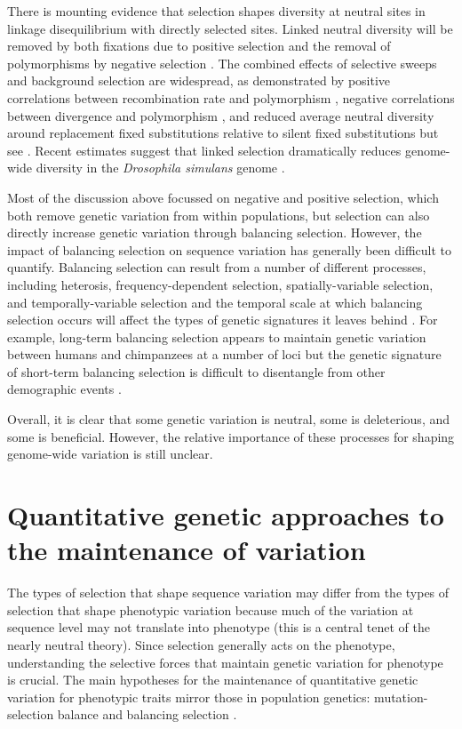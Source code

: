 There is mounting evidence that selection shapes diversity at neutral sites in linkage disequilibrium with directly selected sites. Linked neutral diversity will be removed by both fixations due to positive selection \citep{Smith1974} and the removal of polymorphisms by negative selection \citep{Charlesworth1993-xx}. The combined effects of selective sweeps and background selection are widespread, as demonstrated by positive correlations between recombination rate and polymorphism \citep{Cutter2003-yq,Nachman1998-vc,Kim2007-ju,Begun2007-gh,Tenaillon2001-ai}, negative correlations between divergence and polymorphism \citep{Andolfatto2007-ew,Hahn2008-yj,Macpherson2007-pl}, and reduced average neutral diversity around replacement fixed substitutions relative to silent fixed substitutions \citep{Sattath2011-ns} but see \citep{hernandez2011}. Recent estimates suggest that linked selection dramatically reduces genome-wide diversity in the \textit{Drosophila simulans} genome \citep{Elyashiv2014-ic}.

Most of the discussion above focussed on negative and positive selection, which both remove genetic variation from within populations, but selection can also directly increase genetic variation through balancing selection. However, the impact of balancing selection on sequence variation has generally been difficult to quantify. Balancing selection can result from a number of different processes, including heterosis, frequency-dependent selection, spatially-variable selection, and temporally-variable selection \citep{Hedrick2006-ft,Hedrick1976-qp} and the temporal scale at which balancing selection occurs will affect the types of genetic signatures it leaves behind \citep{Charlesworth2006-mw}. For example, long-term balancing selection appears to maintain genetic variation between humans and chimpanzees at a number of loci \citep{Leffler2013-wr} but the genetic signature of short-term balancing selection is difficult to disentangle from other demographic events \citep{Charlesworth2006-mw}.

Overall, it is clear that some genetic variation is neutral, some is deleterious, and some is beneficial. However, the relative importance of these processes for shaping genome-wide variation is still unclear.

\section{Quantitative genetic approaches to the maintenance of variation}
The types of selection that shape sequence variation may differ from the types of selection that shape phenotypic variation because much of the variation at sequence level may not translate into phenotype (this is a central tenet of the nearly neutral theory). Since selection generally acts on the phenotype, understanding the selective forces that maintain genetic variation for phenotype is crucial. The main hypotheses for the maintenance of quantitative genetic variation for phenotypic traits mirror those in population genetics: mutation-selection balance and balancing selection \citep{N_H_Barton1989-yu,Johnson2005-dl}.

